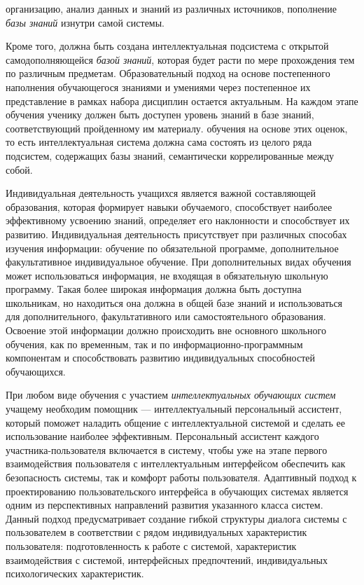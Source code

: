 \begin{textitemize}
организацию, анализ данных и знаний из различных источников, пополнение \textit{базы знаний} изнутри самой системы.
	\item Кроме того, должна быть создана интеллектуальная подсистема с открытой самодополняющейся \textit{базой знаний}, которая будет расти по мере прохождения тем по различным предметам. Образовательный подход на основе постепенного наполнения обучающегося знаниями и умениями через постепенное их представление в рамках набора дисциплин остается актуальным. На каждом этапе обучения ученику должен быть доступен уровень знаний в базе знаний, соответствующий пройденному им материалу. обучения на основе этих оценок, то есть интеллектуальная система должна сама состоять из целого ряда подсистем, содержащих базы знаний, семантически коррелированные между собой.
\end{textitemize} 

Индивидуальная деятельность учащихся является важной составляющей образования, которая формирует навыки обучаемого, способствует наиболее эффективному усвоению знаний, определяет его наклонности и способствует их развитию. Индивидуальная деятельность присутствует при различных способах изучения информации: обучение по обязательной программе, дополнительное факультативное индивидуальное обучение. При дополнительных видах обучения может использоваться информация, не входящая в обязательную школьную программу. Такая более широкая информация должна быть доступна школьникам, но находиться она должна в общей базе знаний и использоваться для дополнительного, факультативного или самостоятельного образования. Освоение этой информации должно происходить вне основного школьного обучения, как по временным, так и по информационно-программным компонентам и способствовать развитию индивидуальных способностей обучающихся.

При любом виде обучения  с участием \textit{интеллектуальных обучающих систем} учащему необходим помощник --- интеллектуальный персональный ассистент, который  поможет наладить общение с интеллектуальной системой и сделать ее использование наиболее эффективным. Персональный ассистент каждого участника-пользователя включается в систему, чтобы уже на этапе первого взаимодействия пользователя с интеллектуальным интерфейсом обеспечить как безопасность системы, так и комфорт работы пользователя. Адаптивный подход к проектированию пользовательского интерфейса в обучающих системах является одним из перспективных направлений развития указанного класса систем. Данный подход предусматривает создание гибкой структуры диалога системы с пользователем в соответствии с рядом индивидуальных характеристик пользователя: подготовленность к работе с системой, характеристик взаимодействия с системой, интерфейсных предпочтений, индивидуальных психологических характеристик.

